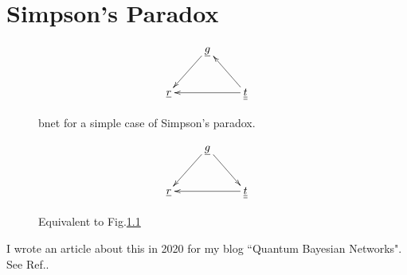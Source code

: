 \chapter{Simpson's Paradox}

\begin{figure}[h!]
\centering
$$\xymatrix{
&\rvg\ar[dl]&\\
\rvr&&\ul{\rvt}\ar[ul]\ar[ll]
}$$
\caption{bnet for a simple case of 
Simpson's paradox.}
\label{fig-simpson-a}
\end{figure}

\begin{figure}[h!]
\centering
$$\xymatrix{
&\rvg\ar[dl]\ar[dr]&\\
\rvr&&\ul{\rvt}\ar[ll]
}$$
\caption{Equivalent to 
Fig.\ref{fig-simpson-a}}
\label{fig-simpson-b}
\end{figure}

I wrote an article about
this in 2020 for
my blog ``Quantum Bayesian Networks". 
See Ref.\cite{simpson-blog}.
